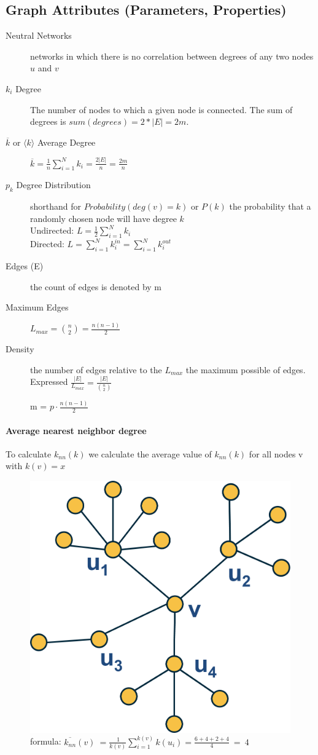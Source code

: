 \documentclass{article}
\begin{document}
\subsection{Graph Attributes (Parameters, Properties)}
\begin{description}
    \item [Neutral Networks] networks in which there is no correlation between degrees of any two nodes $u$ and $v$
    \item[$k_i$ Degree] The number of nodes to which a given node is connected. The sum of degrees is $sum(degrees)=2*|E|=2m$.
    \item[$\overline{k} $ or $\langle k\rangle$ Average Degree]  $\overline{k}= \frac{1}{n}\sum\limits_{i = 1}^N {k_i } =\frac{2|E|}{n}=\frac{2m}{n}$
    \item[$p_k$ Degree Distribution] shorthand for $Probability (deg(v) = k)$ or $P(k)$ the probability that a randomly chosen node will have degree $k$ \\
    Undirected:             $L = \frac{1}{2}\sum\limits_{i = 1}^N {k_i }$ \\
    Directed: $L = \sum\limits_{i = 1}^N {k_i^{in} }  = \sum\limits_{i = 1}^N {k_i^{out} }$
    \item [Edges (E)]the count of edges is denoted by m
    \item[Maximum Edges]  $L_{max}={\binom{n}{2}}=\frac{n(n-1)}{2}$
    \item [Density] the number of edges relative to the $L_{max}$ the maximum possible of edges. Expressed $\frac{|E|}{L_{max}} =  \frac{|E|}{\binom{n}{2}}$

m = $p\cdot\frac{n(n-1)}{2}$
\end{description}
\paragraph{Average nearest neighbor degree }
To calculate $k_{nn}(k)$ we calculate the average value of $k_{nn}(k)$ for all nodes v with $k(v)=x$

\begin{figure}
    \centering
    \includegraphics[width=0.5\linewidth]{k-neighbor-example.png}
    \caption{formula: $\overline{k_{nn}}(v)\:=\frac{\:1}{k(v)}\sum\limits_{i=1}^{k(v)}k(u_i)=\frac{6+4+2+4}{4}\:=\:4$}
\end{figure}
\end{document}
